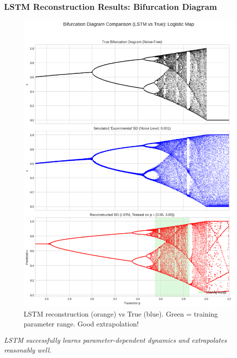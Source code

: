 \documentclass{beamer}
\begin{document}
\begin{frame}
    \frametitle{LSTM Reconstruction Results: Bifurcation Diagram}
    \begin{figure}
        \centering
        \includegraphics[width=1.0\linewidth]{figures/lstm_bd_1.png}
        \caption{LSTM reconstruction (orange) vs True (blue). Green = training parameter range. Good extrapolation!}
        \label{fig:lstm_bd_1_slide}
    \end{figure}
    \textit{LSTM successfully learns parameter-dependent dynamics and extrapolates reasonably well.}
\end{frame}
\end{document}
